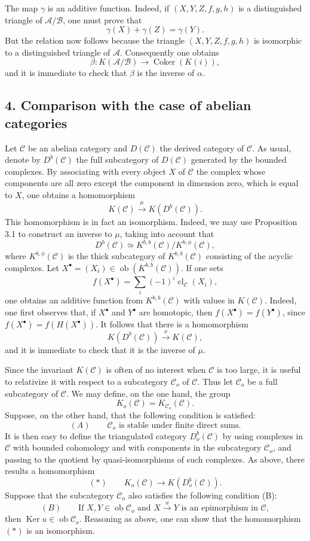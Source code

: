\documentclass[11pt]{article}
\providecommand{\Ob}{\operatorname{ob}}
\providecommand{\cC}{\mathcal C}
\providecommand{\Ob}{\operatorname{ob}}
\providecommand{\cC}{\mathcal C}
\providecommand{\cA}{\mathcal A}
\providecommand{\cB}{\mathcal B}
\providecommand{\Ob}{\operatorname{Ob}}
\providecommand{\Ob}{\operatorname{ob}}
\begin{document}
The map $\gamma$ is an additive function. Indeed, if $(X,Y,Z,f,g,h)$ is a distinguished triangle of $\cA/\cB$, one must prove that
\[
\gamma(X)+\gamma(Z)=\gamma(Y).
\]
But the relation now follows because the triangle $(X,Y,Z,f,g,h)$ is isomorphic to a distinguished triangle of $\cA$. Consequently one obtains
\[
\beta:K(\cA/\cB)\longrightarrow \operatorname{Coker}(K(i)),
\]
and it is immediate to check that $\beta$ is the inverse of $\alpha$.

\subsection*{4. Comparison with the case of abelian categories}

Let $\cC$ be an abelian category and $D(\cC)$ the derived category of $\cC$. As usual, denote by $D^b(\cC)$ the full subcategory of $D(\cC)$ generated by the bounded complexes. By associating with every object $X$ of $\cC$ the complex whose components are all zero except the component in dimension zero, which is equal to $X$, one obtains a homomorphism
\[
K(\cC)\xrightarrow{\mu}K(D^b(\cC)).
\]
This homomorphism is in fact an isomorphism. Indeed, we may use Proposition 3.1 to construct an inverse to $\mu$, taking into account that
\[
D^b(\cC)\simeq K^{b,b}(\cC)/K^{b,\phi}(\cC),
\]
where $K^{b,\phi}(\cC)$ is the thick subcategory of $K^{b,b}(\cC)$ consisting of the acyclic complexes. Let $X^\bullet=(X_i)\in\Ob(K^{b,b}(\cC))$. If one sets
\[
f(X^\bullet)=\sum_i(-1)^i\operatorname{cl}_{\cC}(X_i),
\]
one obtains an additive function from $K^{b,b}(\cC)$ with values in $K(\cC)$. Indeed, one first observes that, if $X^\bullet$ and $Y^\bullet$ are homotopic, then $f(X^\bullet)=f(Y^\bullet)$, since $f(X^\bullet)=f(H(X^\bullet))$. It follows that there is a homomorphism
\[
K(D^b(\cC))\xrightarrow{\nu}K(\cC),
\]
and it is immediate to check that it is the inverse of $\mu$.

Since the invariant $K(\cC)$ is often of no interest when $\cC$ is too large, it is useful to relativize it with respect to a subcategory $\cC_o$ of $\cC$. Thus let $\cC_o$ be a full subcategory of $\cC$. We may define, on the one hand, the group
\[
K_o(\cC)=K_{\cC_o}(\cC).
\]
Suppose, on the other hand, that the following condition is satisfied:
\[
(A)\qquad \cC_o\text{ is stable under finite direct sums.}
\]
It is then easy to define the triangulated category $D_o^b(\cC)$ by using complexes in $\cC$ with bounded cohomology and with components in the subcategory $\cC_o$, and passing to the quotient by quasi-isomorphisms of such complexes. As above, there results a homomorphism
\[
(*)\qquad K_o(\cC)\longrightarrow K(D_o^b(\cC)).
\]
Suppose that the subcategory $\cC_o$ also satisfies the following condition (B):
\[
(B)\qquad
\text{If }X,Y\in\Ob\cC_o\text{ and }X\xrightarrow{u}Y
\text{ is an epimorphism in }\cC,
\]
then $\operatorname{Ker}u\in\Ob\cC_o$. Reasoning as above, one can show that the homomorphism $(*)$ is an isomorphism.
\end{document}
